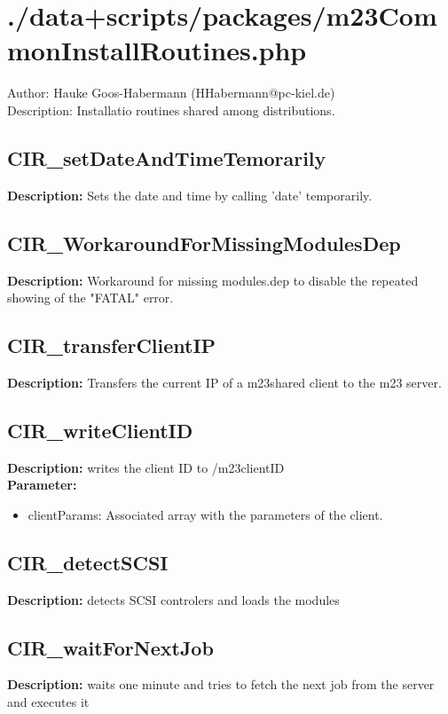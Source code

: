 
\newpage\section{./data+scripts/packages/m23CommonInstallRoutines.php}
 Author: Hauke Goos-Habermann (HHabermann@pc-kiel.de)\\
 Description: Installatio routines shared among distributions.\\

\subsection{CIR\_setDateAndTimeTemorarily}
\textbf{Description:} Sets the date and time by calling 'date' temporarily.\\

\subsection{CIR\_WorkaroundForMissingModulesDep}
\textbf{Description:} Workaround for missing modules.dep to disable the repeated showing of the "FATAL" error.\\

\subsection{CIR\_transferClientIP}
\textbf{Description:} Transfers the current IP of a m23shared client to the m23 server.\\

\subsection{CIR\_writeClientID}
\textbf{Description:} writes the client ID to /m23clientID\\
\textbf{Parameter:}
\begin{itemize}
\item clientParams: Associated array with the parameters of the client.
\end{itemize}

\subsection{CIR\_detectSCSI}
\textbf{Description:} detects SCSI controlers and loads the modules\\

\subsection{CIR\_waitForNextJob}
\textbf{Description:} waits one minute and tries to fetch the next job from the server and executes it\\

